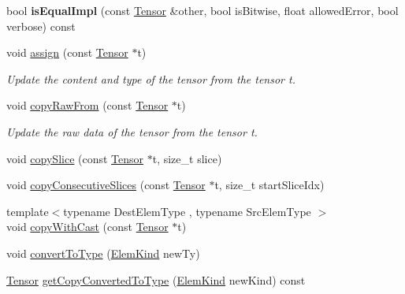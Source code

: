 \begin{DoxyCompactItemize}
\item 
\mbox{\label{classglow_1_1_tensor_afe490fac96b01156ffb682cba77a40ed}} 
bool {\bfseries is\+Equal\+Impl} (const \hyperlink{classglow_1_1_tensor}{Tensor} \&other, bool is\+Bitwise, float allowed\+Error, bool verbose) const
\item 
\mbox{\label{classglow_1_1_tensor_a95b433338320e6b2b2ecf76f44da37da}} 
void \hyperlink{classglow_1_1_tensor_a95b433338320e6b2b2ecf76f44da37da}{assign} (const \hyperlink{classglow_1_1_tensor}{Tensor} $\ast$t)
\begin{DoxyCompactList}\small\item\em Update the content and type of the tensor from the tensor {\ttfamily t}. \end{DoxyCompactList}\item 
\mbox{\label{classglow_1_1_tensor_af51cf4de0d985f4c2d0aa08ac82fbc1c}} 
void \hyperlink{classglow_1_1_tensor_af51cf4de0d985f4c2d0aa08ac82fbc1c}{copy\+Raw\+From} (const \hyperlink{classglow_1_1_tensor}{Tensor} $\ast$t)
\begin{DoxyCompactList}\small\item\em Update the raw data of the tensor from the tensor {\ttfamily t}. \end{DoxyCompactList}\item 
void \hyperlink{classglow_1_1_tensor_a2859b4783c2e9c2a661d5d52754147df}{copy\+Slice} (const \hyperlink{classglow_1_1_tensor}{Tensor} $\ast$t, size\+\_\+t slice)
\item 
void \hyperlink{classglow_1_1_tensor_a66a32f8e59470dcda68232cbb1a05399}{copy\+Consecutive\+Slices} (const \hyperlink{classglow_1_1_tensor}{Tensor} $\ast$t, size\+\_\+t start\+Slice\+Idx)
\item 
{\footnotesize template$<$typename Dest\+Elem\+Type , typename Src\+Elem\+Type $>$ }\\void \hyperlink{classglow_1_1_tensor_ae944ce87f0c192971b423b5fe93baaa9}{copy\+With\+Cast} (const \hyperlink{classglow_1_1_tensor}{Tensor} $\ast$t)
\item 
void \hyperlink{classglow_1_1_tensor_a68745fea2e9158f33b0254db7e14be9a}{convert\+To\+Type} (\hyperlink{namespaceglow_ab92e14a94329daf4083db670e95fbcdf}{Elem\+Kind} new\+Ty)
\item 
\hyperlink{classglow_1_1_tensor}{Tensor} \hyperlink{classglow_1_1_tensor_a5a65f889cbe5429225fe9d2ffe431a38}{get\+Copy\+Converted\+To\+Type} (\hyperlink{namespaceglow_ab92e14a94329daf4083db670e95fbcdf}{Elem\+Kind} new\+Kind) const

\end{DoxyCompactItemize}
